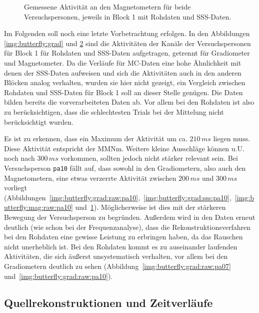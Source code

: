 \documentclass[doc,a4paper,12pt]{apa6}
\begin{document}
\begin{figure}
\begin{subfigure}[c]{0.36\textwidth}
    \label{img:butterfly:mag:sss:pa10}
  \end{subfigure}
  \vspace*{3mm}
  \captionsetup{justification=justified}
  \caption[Gemessene Aktivität an den Magnetometern]{Gemessene Aktivität an den Magnetometern für beide Versuchspersonen, jeweils in Block 1 mit Rohdaten und SSS-Daten.}
  \label{img:butterfly:mag}
\end{figure}

Im Folgenden soll noch eine letzte Vorbetrachtung erfolgen. In den Abbildungen \ref{img:butterfly:grad} und \ref{img:butterfly:mag} sind die Aktivitäten der Kanäle der Versuchspersonen für Block 1 für Rohdaten und SSS-Daten aufgetragen, getrennt für Gradiometer und Magnetometer. Da die Verläufe für MC-Daten eine hohe Ähnlichkeit mit denen der SSS-Daten aufweisen und sich die Aktivitäten auch in den anderen Blöcken analog verhalten, wurden sie hier nicht gezeigt, ein Vergleich zwischen Rohdaten und SSS-Daten für Block 1 soll an dieser Stelle genügen. Die Daten bilden bereits die vorverarbeiteten Daten ab. Vor allem bei den Rohdaten ist also zu berücksichtigen, dass die schlechtesten Trials bei der Mittelung nicht berücksichtigt wurden.

Es ist zu erkennen, dass ein Maximum der Aktivität um ca. $210\,ms$ liegen muss. Diese Aktivität entspricht der MMNm. Weitere kleine Ausschläge können u.U. noch nach $300\,ms$ vorkommen, sollten jedoch nicht stärker relevant sein. Bei Versuchsperson \texttt{pa10} fällt auf, dass sowohl in den Gradiometern, also auch den Magnetometern, eine etwas verzerrte Aktivität zwischen $200\,ms$ und $300\,ms$ vorliegt (Abbildungen~\ref{img:butterfly:grad:raw:pa10},~\ref{img:butterfly:grad:sss:pa10},~\ref{img:butterfly:mag:raw:pa10} und~\ref{img:butterfly:mag:sss:pa10}). Möglicherweise ist dies mit der stärkeren Bewegung der Versuchsperson zu begründen. Außerdem wird in den Daten erneut deutlich (wie schon bei der Frequenzanalyse), dass die Rekonstruktionsverfahren bei den Rohdaten eine gewisse Leistung zu erbringen haben, da das Rauschen nicht unerheblich ist. Bei den Rohdaten kommt es zu auseinander laufenden Aktivitäten, die sich äußerst unsystematisch verhalten, vor allem bei den Gradiometern deutlich zu sehen (Abbildung~\ref{img:butterfly:grad:raw:pa07} und~\ref{img:butterfly:grad:raw:pa10}).

\subsection{Quellrekonstruktionen und Zeitverläufe}
\end{document}
